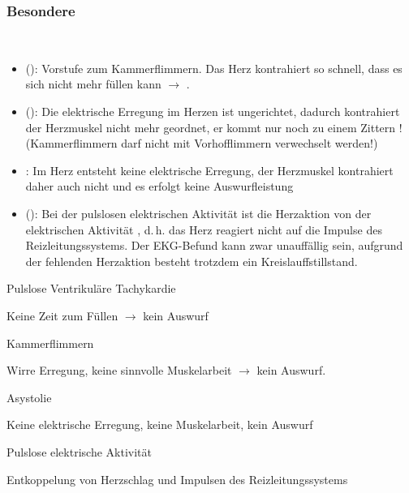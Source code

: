 \clearpage%


\subsubsection{Besondere }


{~
\begin{itemize}
  \item {} ():
  \label{topic:pulslose-ventrikulaere-tachykardie}
  Vorstufe zum Kammerflimmern. Das Herz kontrahiert
  so schnell, dass es sich nicht mehr füllen kann
  ${\rightarrow}$ .
  \item {} ():
  \label{topic:kammerflimmern}
   Die elektrische
  Erregung im Herzen ist ungerichtet, dadurch kontrahiert der Herzmuskel  nicht mehr geordnet,
  er kommt nur noch zu einem Zittern ! (Kammerflimmern darf nicht mit Vorhofflimmern verwechselt werden!)
  \item {}:
  \label{topic:asystolie}
  Im Herz entsteht keine elektrische
  Erregung, der Herzmuskel kontrahiert daher auch nicht und es erfolgt
  {keine Auswurfleistung}
  \item {} (): Bei der
  pulslosen elektrischen Aktivität ist die Herzaktion von
  der elektrischen Aktivität , d.\,h. das Herz
  reagiert nicht auf die Impulse des Reizleitungssystems. Der
  EKG-Befund kann zwar unauffällig sein, aufgrund der
  fehlenden Herzaktion besteht trotzdem ein
  Kreislauffstillstand.
\end{itemize}
}
{
\begin{compactitem}
  \item Pulslose Ventrikuläre Tachykardie
  \begin{compactitem}
    \item Keine Zeit zum Füllen ${\rightarrow}$ kein Auswurf
  \end{compactitem}
  \item Kammerflimmern
  \begin{compactitem}  
    \item Wirre Erregung, keine sinnvolle Muskelarbeit ${\rightarrow}$ kein
    Auswurf.
  \end{compactitem}
  \item Asystolie
  \begin{compactitem}
    \item Keine elektrische Erregung, keine Muskelarbeit, kein
    Auswurf
  \end{compactitem}
  \item Pulslose elektrische Aktivität
  \begin{compactitem}
    \item Entkoppelung von Herzschlag und Impulsen des Reizleitungssystems
  \end{compactitem}
\end{compactitem}

}{}{}{}



